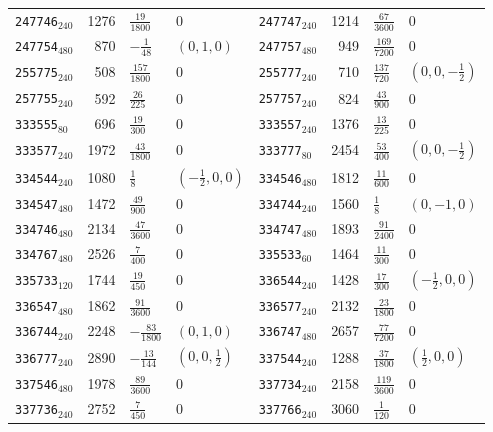 {\begin{longtable}{@{}lrll@{\hspace{2em}}lrll@{}}
\texttt{247746}$_{240}$ & 1276 & $\tfrac{19}{1800}$ & 0 & \texttt{247747}$_{240}$ & 1214 & $\tfrac{67}{3600}$ & 0\\
\texttt{247754}$_{480}$ & 870 & $-\tfrac{1}{48}$ & $(0,1,0)$ & \texttt{247757}$_{480}$ & 949 & $\tfrac{169}{7200}$ & 0\\
\texttt{255775}$_{240}$ & 508 & $\tfrac{157}{1800}$ & 0 & \texttt{255777}$_{240}$ & 710 & $\tfrac{137}{720}$ & $(0,0,-\tfrac{1}{2})$\\
\texttt{257755}$_{240}$ & 592 & $\tfrac{26}{225}$ & 0 & \texttt{257757}$_{240}$ & 824 & $\tfrac{43}{900}$ & 0\\
\texttt{333555}$_{80}$ & 696 & $\tfrac{19}{300}$ & 0 & \texttt{333557}$_{240}$ & 1376 & $\tfrac{13}{225}$ & 0\\
\texttt{333577}$_{240}$ & 1972 & $\tfrac{43}{1800}$ & 0 & \texttt{333777}$_{80}$ & 2454 & $\tfrac{53}{400}$ & $(0,0,-\tfrac{1}{2})$\\
\texttt{334544}$_{240}$ & 1080 & $\tfrac{1}{8}$ & $(-\tfrac{1}{2},0,0)$ & \texttt{334546}$_{480}$ & 1812 & $\tfrac{11}{600}$ & 0\\
\texttt{334547}$_{480}$ & 1472 & $\tfrac{49}{900}$ & 0 & \texttt{334744}$_{240}$ & 1560 & $\tfrac{1}{8}$ & $(0,-1,0)$\\
\texttt{334746}$_{480}$ & 2134 & $\tfrac{47}{3600}$ & 0 & \texttt{334747}$_{480}$ & 1893 & $\tfrac{91}{2400}$ & 0\\
\texttt{334767}$_{480}$ & 2526 & $\tfrac{7}{400}$ & 0 & \texttt{335533}$_{60}$ & 1464 & $\tfrac{11}{300}$ & 0\\
\texttt{335733}$_{120}$ & 1744 & $\tfrac{19}{450}$ & 0 & \texttt{336544}$_{240}$ & 1428 & $\tfrac{17}{300}$ & $(-\tfrac{1}{2},0,0)$\\
\texttt{336547}$_{480}$ & 1862 & $\tfrac{91}{3600}$ & 0 & \texttt{336577}$_{240}$ & 2132 & $\tfrac{23}{1800}$ & 0\\
\texttt{336744}$_{240}$ & 2248 & $-\tfrac{83}{1800}$ & $(0,1,0)$ & \texttt{336747}$_{480}$ & 2657 & $\tfrac{77}{7200}$ & 0\\
\texttt{336777}$_{240}$ & 2890 & $-\tfrac{13}{144}$ & $(0,0,\tfrac{1}{2})$ & \texttt{337544}$_{240}$ & 1288 & $\tfrac{37}{1800}$ & $(\tfrac{1}{2},0,0)$\\
\texttt{337546}$_{480}$ & 1978 & $\tfrac{89}{3600}$ & 0 & \texttt{337734}$_{240}$ & 2158 & $\tfrac{119}{3600}$ & 0\\
\texttt{337736}$_{240}$ & 2752 & $\tfrac{7}{450}$ & 0 & \texttt{337766}$_{240}$ & 3060 & $\tfrac{1}{120}$ & 0\\

\end{longtable}}
